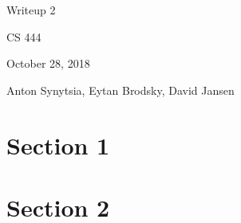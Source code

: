 \documentclass[onecolumn, draftclsnofoot, 10pt, compsoc]{../ThirdParty/IEEEtran}
\begin{document}
\begin{titlepage}
\begin{singlespace}
\centering
\scshape{
    \huge{Writeup 2}\par
    \vspace{.5in}
    \large{CS 444}\par
    \large{October 28, 2018}\par
    \vspace{.5in}
    \large{Anton Synytsia, Eytan Brodsky, David Jansen}\par
    \vspace{.5in}
    \vfill
}
\end{singlespace}
\end{titlepage}
\newpage
{}
\tableofcontents
\clearpage

\section{Section 1}
\section{Section 2}


\clearpage
\medskip


\end{document}
